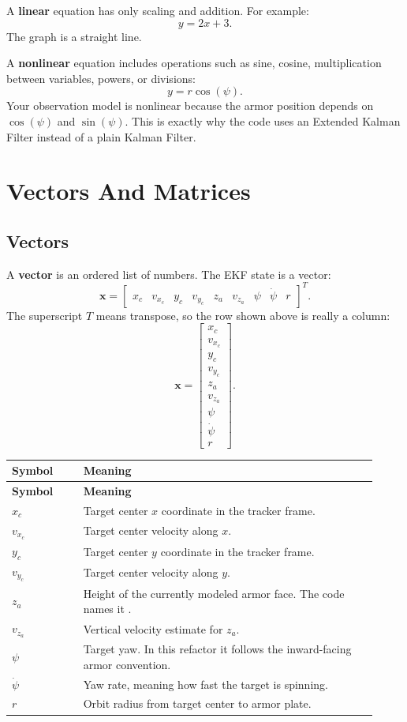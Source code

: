 \documentclass[11pt,a4paper]{article}
\newcommand{\code}[1]{\ifmmode\text{\ttfamily\detokenize{#1}}\else\texttt{\detokenize{#1}}\fi}
\newcommand{\vect}[1]{\bm{#1}}
\begin{document}
A \textbf{linear} equation has only scaling and addition.
For example:
\[
  y = 2x + 3.
\]
The graph is a straight line.

A \textbf{nonlinear} equation includes operations such as sine, cosine, multiplication between variables, powers, or divisions:
\[
  y = r\cos(\psi).
\]
Your observation model is nonlinear because the armor position depends on \(\cos(\psi)\) and \(\sin(\psi)\).
This is exactly why the code uses an Extended Kalman Filter instead of a plain Kalman Filter.

\section{Vectors And Matrices}

\subsection{Vectors}

A \textbf{vector} is an ordered list of numbers.
The EKF state is a vector:
\[
\vect{x} =
\begin{bmatrix}
x_c & v_{x_c} & y_c & v_{y_c} & z_a & v_{z_a} & \psi & \dot{\psi} & r
\end{bmatrix}^{T}.
\]
The superscript \(T\) means transpose, so the row shown above is really a column:
\[
\vect{x} =
\begin{bmatrix}
x_c\\
v_{x_c}\\
y_c\\
v_{y_c}\\
z_a\\
v_{z_a}\\
\psi\\
\dot{\psi}\\
r
\end{bmatrix}.
\]

\begin{longtable}{p{0.18\linewidth} p{0.74\linewidth}}
\toprule
\textbf{Symbol} & \textbf{Meaning} \\
\midrule
\endfirsthead
\toprule
\textbf{Symbol} & \textbf{Meaning} \\
\midrule
\endhead
\(x_c\) & Target center \(x\) coordinate in the tracker frame. \\
\(v_{x_c}\) & Target center velocity along \(x\). \\
\(y_c\) & Target center \(y\) coordinate in the tracker frame. \\
\(v_{y_c}\) & Target center velocity along \(y\). \\
\(z_a\) & Height of the currently modeled armor face. The code names it \code{za}. \\
\(v_{z_a}\) & Vertical velocity estimate for \(z_a\). \\
\(\psi\) & Target yaw. In this refactor it follows the inward-facing armor convention. \\
\(\dot{\psi}\) & Yaw rate, meaning how fast the target is spinning. \\
\(r\) & Orbit radius from target center to armor plate. \\
\bottomrule
\end{longtable}
\end{document}
